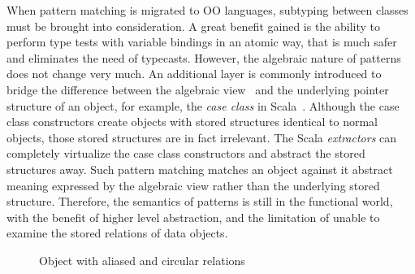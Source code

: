 When pattern matching is migrated to \gls{OO} languages, subtyping between classes must be brought into consideration.
A great benefit gained is the ability to perform type tests with variable bindings in an atomic way,
that is much safer and eliminates the need of typecasts.
However, the algebraic nature of patterns does not change very much.
An additional layer is commonly introduced to bridge the difference between the algebraic view~\cite{burton1993pattern}
and the underlying pointer structure of an object, for example, the \emph{case class} in Scala~\cite{odersky2021scala}.
Although the case class constructors create objects with stored structures identical to normal objects,
those stored structures are in fact irrelevant.
The Scala \emph{extractors} can completely virtualize the case class constructors and abstract the stored structures away.
Such pattern matching matches an object against it abstract meaning expressed by the algebraic view rather than the underlying stored structure.
Therefore, the semantics of patterns is still in the functional world, with the benefit of higher level abstraction,
and the limitation of unable to examine the stored relations of data objects.

\begin{figure}[t]
\centering
{}
\caption{Object with aliased and circular relations}\label{fig:obj-pattern}
\end{figure}

